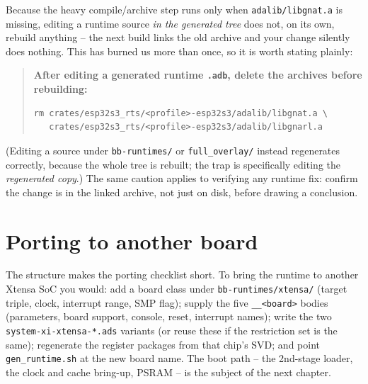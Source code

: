 Because the heavy compile/archive step runs only when
\texttt{adalib/libgnat.a} is missing, editing a runtime source \emph{in the
generated tree} does not, on its own, rebuild anything -- the next build links
the old archive and your change silently does nothing. This has burned us more
than once, so it is worth stating plainly:

\begin{quote}
\textbf{After editing a generated runtime \texttt{.adb}, delete the archives
before rebuilding:}
\begin{lstlisting}[style=sh]
rm crates/esp32s3_rts/<profile>-esp32s3/adalib/libgnat.a \
   crates/esp32s3_rts/<profile>-esp32s3/adalib/libgnarl.a
\end{lstlisting}
\end{quote}

(Editing a source under \texttt{bb-runtimes/} or \texttt{full\_overlay/} instead
regenerates correctly, because the whole tree is rebuilt; the trap is specifically
editing the \emph{regenerated copy}.) The same caution applies to verifying any
runtime fix: confirm the change is in the linked archive, not just on disk,
before drawing a conclusion.

\section{Porting to another board}

The structure makes the porting checklist short. To bring the runtime to another
Xtensa SoC you would: add a board class under \texttt{bb-runtimes/xtensa/} (target
triple, clock, interrupt range, SMP flag); supply the five \texttt{\_\_<board>}
bodies (parameters, board support, console, reset, interrupt names); write the
two \texttt{system-xi-xtensa-*.ads} variants (or reuse these if the restriction
set is the same); regenerate the register packages from that chip's SVD; and
point \texttt{gen\_runtime.sh} at the new board name. The boot path -- the
2nd-stage loader, the clock and cache bring-up, PSRAM -- is the subject of the
next chapter.
